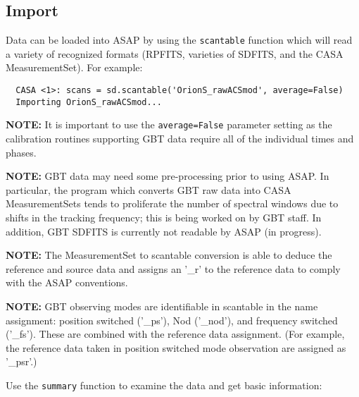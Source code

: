 \subsection{Import}
\label{subsection:sd.asap.import}

Data can be loaded into ASAP by using the {\tt scantable} function
which will read a variety of recognized formats (RPFITS, varieties of
SDFITS, and the CASA MeasurementSet). For example:


\small
\begin{verbatim}
  CASA <1>: scans = sd.scantable('OrionS_rawACSmod', average=False)
  Importing OrionS_rawACSmod...
\end{verbatim}
\normalsize

{\bf NOTE:} It is important to use the {\tt average=False} parameter
setting as the calibration routines supporting GBT data require all of
the individual times and phases.

{\bf NOTE:} GBT data may need some pre-processing prior to using
ASAP. In particular, the program which converts GBT raw data into CASA
MeasurementSets tends to proliferate the number of spectral windows
due to shifts in the tracking frequency; this is being worked on by
GBT staff. In addition, GBT SDFITS is currently not readable by ASAP
(in progress).

{\bf NOTE:} The MeasurementSet to scantable conversion is able to deduce
the reference and source data and assigns an '\_r' to the reference
data to comply with the ASAP conventions.

{\bf NOTE:} GBT observing modes are identifiable in scantable in the
name assignment: position switched ('\_ps'), Nod ('\_nod'), and
frequency switched ('\_fs'). These are combined with the reference data
assignment. (For example, the reference data taken in position
switched mode observation are assigned as '\_psr'.)

Use the {\tt summary} function to examine the data and get basic information:

